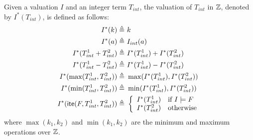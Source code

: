 Given a valuation $I$ and an integer term $T_{int}$, the valuation of $T_{int}$ in $\mathbb{Z}$,
denoted by $I^*(T_{int})$, is defined as follows:
\begin{align*}
I^*(k) \triangleq&\ k
\\
I^*(a) \triangleq&\ I_{int}(a)
\\
I^*(T^1_{int} + T^2_{int}) \triangleq&\ I^*(T^1_{int})  + I^*(T^2_{int})
\\
I^*(T^1_{int} - T^2_{int}) \triangleq&\ I^*(T^1_{int})  - I^*(T^2_{int})
\\
I^*(\max(T^1_{int}, T^2_{int})) \triangleq&\ \max(I^*(T^1_{int}), I^*(T^2_{int}))
\\
I^*(\min(T^1_{int}, T^2_{int})) \triangleq&\ \min(I^*(T^1_{int}), I^*(T^2_{int}))
\\
I^*(\textsf{ite}(F, T^1_{int}, T^2_{int})) \triangleq&\
\left\{\begin{array}{ll}
I^*(T^1_{int}) & \mbox{if } I\models F \\
I^*(T^2_{int}) & \mbox{otherwise}
\end{array}\right.
\end{align*}
where $\max(k_1,k_2)$ and $\min(k_1,k_2)$ are the minimum and maximum operations over $\mathbb{Z}$.


